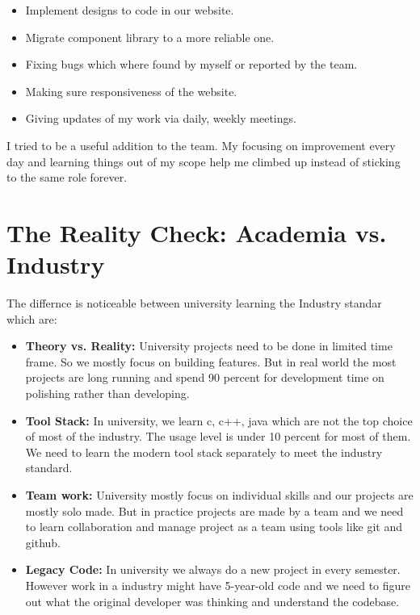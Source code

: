 \begin{itemize}
    \item Implement designs to code in our website.
    \item Migrate component library to a more reliable one.
    \item Fixing bugs which where found by myself or reported by the team.
    \item Making sure responsiveness of the website.
    \item Giving updates of my work via daily, weekly meetings.
\end{itemize}

\par I tried to be a useful addition to the team. My focusing on improvement every day and learning things out of my scope help me climbed up instead of sticking to the same role forever.

\section{The Reality Check: Academia vs. Industry}

\par The differnce is noticeable between university learning the Industry standar which are:

\begin{itemize}
    \item \textbf{Theory vs. Reality:} University projects need to be done in limited time frame. So we mostly focus on building features. But in real world the most projects are long running and spend 90 percent for development time on polishing rather than developing.
    \item \textbf{Tool Stack:} In university, we learn c, c++, java which are not the top choice of most of the industry. The usage level is under 10 percent for most of them. We need to learn the modern tool stack separately to meet the industry standard.
    \item \textbf{Team work:} University mostly focus on individual skills and our projects are mostly solo made. But in practice projects are made by a team and we need to learn collaboration and manage project as a team using tools like git and github.
    \item \textbf{Legacy Code:} In university we always do a new project in every semester. However work in a industry might have 5-year-old code and  we need to figure out what the original developer was thinking and understand the codebase.
\end{itemize}

